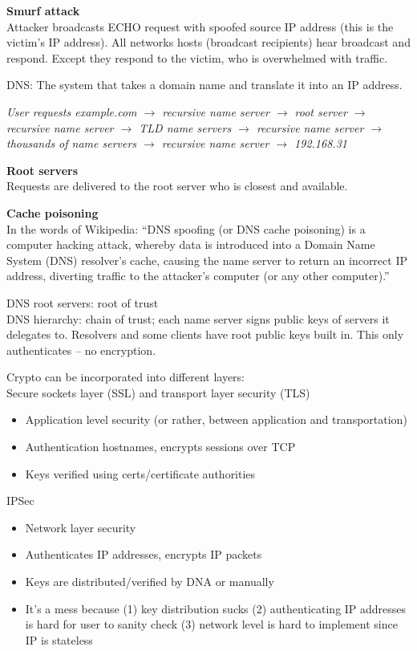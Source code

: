 \textbf{Smurf attack}\\
Attacker broadcasts ECHO request with spoofed source IP address (this is the victim's IP address). All networks hosts (broadcast recipients) hear broadcast and respond. Except they respond to the victim, who is overwhelmed with traffic.

DNS: The system that takes a domain name and translate it into an IP address.

\textit{User requests example.com $\rightarrow$ recursive name server $\rightarrow$ root server $\rightarrow$ recursive name server $\rightarrow$ TLD name servers $\rightarrow$ recursive name server $\rightarrow$ thousands of name servers $\rightarrow$ recursive name server $\rightarrow$ 192.168.31}

\textbf{Root servers}\\
Requests are delivered to the root server who is closest and available.

\textbf{Cache poisoning}\\
In the words of Wikipedia: ``DNS spoofing (or DNS cache poisoning) is a computer hacking attack, whereby data is introduced into a Domain Name System (DNS) resolver's cache, causing the name server to return an incorrect IP address, diverting traffic to the attacker's computer (or any other computer).''

DNS root servers: root of trust\\
DNS hierarchy: chain of trust; each name server signs public keys of servers it delegates to. Resolvers and some clients have root public keys built in. This only authenticates -- no encryption.

Crypto can be incorporated into different layers:\\
Secure sockets layer (SSL) and transport layer security (TLS)
\begin{itemize}
	\item Application level security (or rather, between application and transportation)
	\item Authentication hostnames, encrypts sessions over TCP
	\item Keys verified using certs/certificate authorities
\end{itemize}
IPSec
\begin{itemize}
	\item Network layer security
	\item Authenticates IP addresses, encrypts IP packets
	\item Keys are distributed/verified by DNA or manually
	\item It's a mess because (1) key distribution sucks (2) authenticating IP addresses is hard for user to sanity check (3) network level is hard to implement since IP is stateless
\end{itemize}

